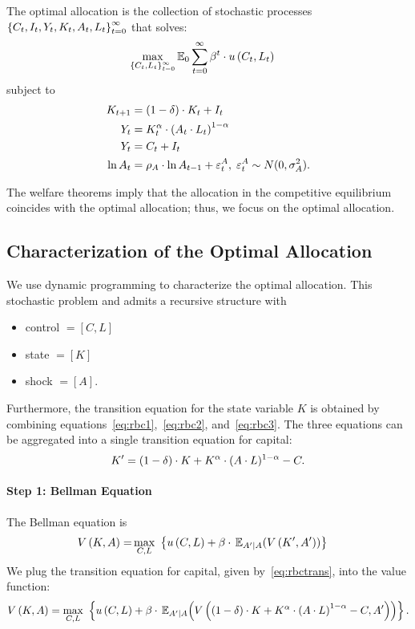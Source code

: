\documentclass[letterpaper,12pt,leqno]{article}
\begin{document}
\begin{definition} The optimal allocation is the collection of stochastic processes $\left\lbrace C_{t},I_{t},Y_{t},K_{t},A_{t},L_{t} \right\rbrace_{t=0}^{\infty}$ that solves:
\begin{align*}
\max_{\bc{C_{t},L_{t}}_{t=0}^{\infty}}&\E_{0} \sum_{t=0}^{\infty}\b^{t}\cdot u\bp{C_{t},L_{t}}
\end{align*}
subject to
\begin{align}
K_{t+1} &=(1-\d)  \cdot K_{t}+I_{t}\label{eq:rbc1}\\
Y_{t}&=K_{t}^{\a}\cdot \bp{A_{t} \cdot L_{t}}^{1-\a}\label{eq:rbc2}\\
Y_{t}&=C_{t}+I_{t}\label{eq:rbc3}\\
\ln A_{t} &=\rho_{A}\cdot \ln A_{t-1} +\varepsilon^{A}_{t},\;\varepsilon^{A}_{t}\sim N(0,\s_{A}^{2}).\nonumber
\end{align}
\end{definition}
The welfare theorems imply that the allocation in the competitive equilibrium coincides with the optimal allocation; thus, we focus on the optimal allocation.

\subsection{Characterization of the Optimal Allocation}

We use dynamic programming to characterize the optimal allocation. This stochastic problem and admits a recursive structure with
\begin{itemize}
\item control $=[C,L]$
\item state $=[K]$
\item shock $=[A]$.
\end{itemize}
Furthermore, the transition equation for the state variable $K$ is obtained by combining equations~\eqref{eq:rbc1},~\eqref{eq:rbc2}, and~\eqref{eq:rbc3}. The three equations can be aggregated into a single transition equation for capital:
\begin{equation}
K'=(1-\delta) \cdot K+K^{\alpha} \cdot (A \cdot L)^{1-\alpha}-C\label{eq:rbctrans}.
\end{equation}

\paragraph{Step 1: Bellman Equation} The Bellman equation is
\begin{align*}
V\bp{K,A}=&\max_{C,L}\ \bc{u\bp{C,L}  +\b\cdot\E[A'|A]{ V\bp{K',A'}  }}
\end{align*}
We plug the transition equation for capital, given by~\eqref{eq:rbctrans}, into the value function:
\begin{align*}
V\bp{K,A}=\max_{C,L}\ \bc{u\bp{C,L}+\b  \cdot \E[A'|A]{V\bp{(1-\d)\cdot K+K^{\a} \cdot \bp{A \cdot L}^{1-\a}-C, A'}}}.
\end{align*}
\end{document}
